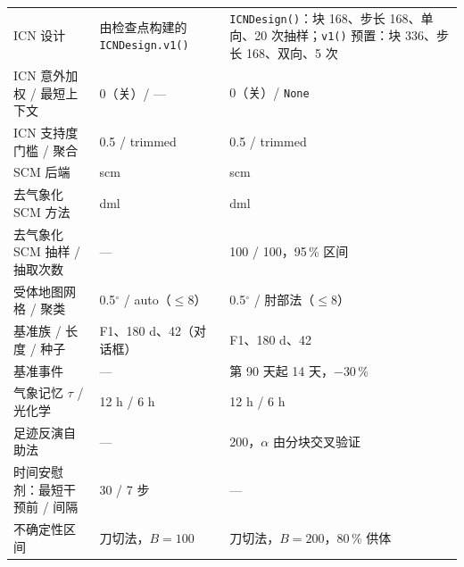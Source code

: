 \documentclass[11pt]{ctexrep}
\newcommand{\codeunderscore}{\textunderscore\allowbreak}
\newcommand{\code}[1]{\texttt{\let\_\codeunderscore #1}}
\begin{document}
\begin{center}
\begin{longtable}{@{}p{4.9cm}p{4.3cm}p{5.8cm}@{}}
ICN 设计                       & 由检查点构建的 \code{ICNDesign.v1()} & \code{ICNDesign()}：块 168、步长 168、单向、20 次抽样；\code{v1()} 预置：块 336、步长 168、双向、5 次 \\
ICN 意外加权 / 最短上下文      & 0（关）/ --- & 0（关）/ \code{None} \\
ICN 支持度门槛 / 聚合          & 0.5 / trimmed & 0.5 / trimmed \\
SCM 后端                       & scm & scm \\
去气象化 SCM 方法             & dml & dml \\
去气象化 SCM 抽样 / 抽取次数   & --- & 100 / 100，95\,\% 区间 \\
受体地图网格 / 聚类           & 0.5$^\circ$ / auto（$\le 8$） & 0.5$^\circ$ / 肘部法（$\le 8$） \\
基准族 / 长度 / 种子           & F1、180 d、42（对话框） & F1、180 d、42 \\
基准事件                       & --- & 第 90 天起 14 天，$-30\,\%$ \\
气象记忆 $\tau$ / 光化学       & 12 h / 6 h & 12 h / 6 h \\
足迹反演自助法                 & --- & 200，$\alpha$ 由分块交叉验证 \\
时间安慰剂：最短干预前 / 间隔  & 30 / 7 步 & --- \\
不确定性区间                   & 刀切法，$B = 100$ & 刀切法，$B = 200$，80\,\% 供体 \\
\bottomrule
\end{longtable}
\end{center}
\end{document}

